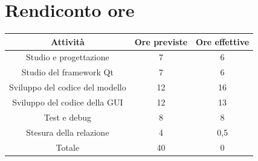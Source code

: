 \documentclass[10pt]{article}
\begin{document}
\section{Rendiconto ore}

\begin{center}
    \begin{tabular}{| c | c | c |} \hline
    Attività & Ore previste & Ore effettive \\\hline
    Studio e progettazione & 7 & 6 \\
    Studio del framework Qt & 7 & 6 \\
    Sviluppo del codice del modello & 12 & 16 \\
    Sviluppo del codice della GUI & 12 & 13 \\
    Test e debug & 8 & 8 \\
    Stesura della relazione & 4 & 0,5 \\\hline
    Totale & 40 & 0 \\\hline
    \end{tabular}
\end{center}
\end{document}
